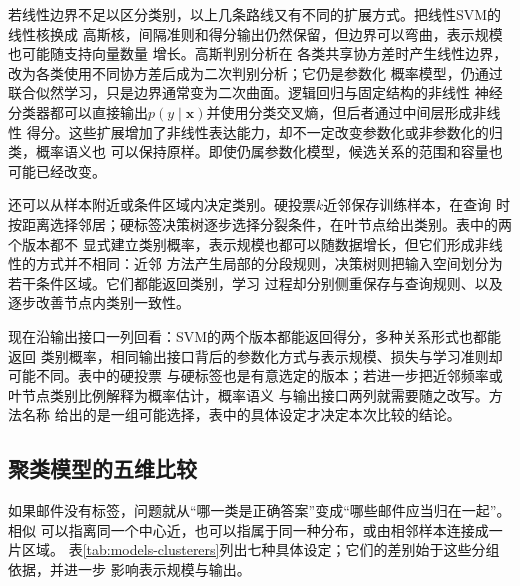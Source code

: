 若线性边界不足以区分类别，以上几条路线又有不同的扩展方式。把线性SVM的线性核换成
高斯核，间隔准则和得分输出仍然保留，但边界可以弯曲，表示规模也可能随支持向量数量
增长。高斯判别分析在
各类共享协方差时产生线性边界，改为各类使用不同协方差后成为二次判别分析；它仍是参数化
概率模型，仍通过联合似然学习，只是边界通常变为二次曲面。逻辑回归与固定结构的非线性
神经分类器都可以直接输出$p(y\mid\bm{x})$并使用分类交叉熵，但后者通过中间层形成非线性
得分。这些扩展增加了非线性表达能力，却不一定改变参数化或非参数化的归类，概率语义也
可以保持原样。即使仍属参数化模型，候选关系的范围和容量也可能已经改变。

还可以从样本附近或条件区域内决定类别。硬投票$k$近邻保存训练样本，在查询
时按距离选择邻居；硬标签决策树逐步选择分裂条件，在叶节点给出类别。表中的两个版本都不
显式建立类别概率，表示规模也都可以随数据增长，但它们形成非线性的方式并不相同：近邻
方法产生局部的分段规则，决策树则把输入空间划分为若干条件区域。它们都能返回类别，学习
过程却分别侧重保存与查询规则、以及逐步改善节点内类别一致性。

现在沿输出接口一列回看：SVM的两个版本都能返回得分，多种关系形式也都能返回
类别概率，相同输出接口背后的参数化方式与表示规模、损失与学习准则却可能不同。表中的硬投票
与硬标签也是有意选定的版本；若进一步把近邻频率或叶节点类别比例解释为概率估计，概率语义
与输出接口两列就需要随之改写。方法名称
给出的是一组可能选择，表中的具体设定才决定本次比较的结论。

\FloatBarrier
\subsection{聚类模型的五维比较}
\label{sec:models-clustering-grid}

如果邮件没有标签，问题就从“哪一类是正确答案”变成“哪些邮件应当归在一起”。相似
可以指离同一个中心近，也可以指属于同一种分布，或由相邻样本连接成一片区域。
表\ref{tab:models-clusterers}列出七种具体设定；它们的差别始于这些分组依据，并进一步
影响表示规模与输出。

